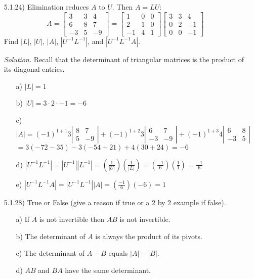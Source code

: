 \documentclass[12pt,pdftex]{article}
\begin{document}
\begin{itemize}
\item[5.1.24)] Elimination reduces $A$ to $U$. Then $A=LU$:
\[A=\left[\begin{array}{rcr} 3 & 3 & 4\\ 6 & 8 & 7\\ -3 & 5 & -9\end{array}\right]
=\left[\begin{array}{rcc} 1 & 0 & 0\\ 2 & 1 & 0\\ -1 & 4 & 1\end{array}\right]
 \left[\begin{array}{ccr} 3 & 3 & 4\\ 0 & 2 & -1\\ 0 & 0 & -1\end{array}\right]\]
Find $|L|$, $|U|$, $|A|$, $|U^{-1}L^{-1}|$, and $|U^{-1}L^{-1}A|$.

\textit{Solution.} Recall that the determinant of triangular matrices is the product of its diagonal entries.
\begin{itemize}
\item[a)] $|L|=1$
\item[b)] $|U|=3 \cdot 2 \cdot -1=-6$
\item[c)] $|A|=(-1)^{1+1}3\left|\begin{array}{ccc} 8 & 7 \\ 5 & -9\end{array}\right|+
		  (-1)^{1+2}3\left|\begin{array}{ccc} 6 & 7 \\ -3 & -9\end{array}\right|+
          (-1)^{1+3}4\left|\begin{array}{ccc} 6 & 8 \\ -3 & 5\end{array}\right|$\\
          $=3(-72-35)-3(-54+21)+4(30+24)=-6$
\item[d)] $|U^{-1}L^{-1}|=|U^{-1}||L^{-1}|=(\frac{1}{|U|})(\frac{1}{|L|})=(\frac{-1}{6})(\frac{1}{1})=\frac{-1}{6}$
\item[e)] $|U^{-1}L^{-1}A|=|U^{-1}L^{-1}||A|=(\frac{-1}{6})(-6)=1$
\end{itemize}

\item[5.1.28)] True or False (give a reason if true or a 2 by 2 example if false).
\begin{itemize}
\item[a)] If $A$ is not invertible then $AB$ is not invertible.
\item[b)] The determinant of $A$ is always the product of its pivots.
\item[c)] The determinant of $A-B$ equals $|A|-|B|$.
\item[d)] $AB$ and $BA$ have the same determinant.
\end{itemize}


\end{itemize}
\end{document}
